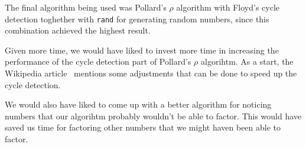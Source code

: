 The final algorithm being used was Pollard's $\rho$ algorithm with Floyd's
cycle detection toghether with \texttt{rand} for generating random numbers,
since this combination achieved the highest result.

Given more time, we would have liked to invest more time in increasing the
performance of the cycle detection part of Pollard's $\rho$ algorihtm. As a
start, the
Wikipedia article~\cite{wiki:pollard} mentions some adjustments that can be
done to speed up the cycle detection.

We would also have liked to come up with a better algorithm for noticing
numbers that our algorihtm probably wouldn't be able to factor. This would have
saved us time for factoring other numbers that we might haven been able 
to factor.
